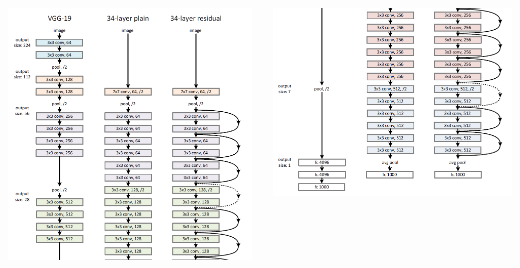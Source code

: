 \begin{frame}[allowframebreaks]
\begin{columns}
	
	\begin{column}{.5\textwidth}
		\begin{center}
			\includegraphics[scale=0.5]{figs/ResNet_zoom1}
		\end{center}
	\end{column}
	
	
	
	
	\begin{column}{.5\textwidth}
		\begin{center}
			\includegraphics[scale=0.5]{figs/ResNet_zoom2}
		\end{center}
	\end{column}%
\end{columns}



\end{frame}




